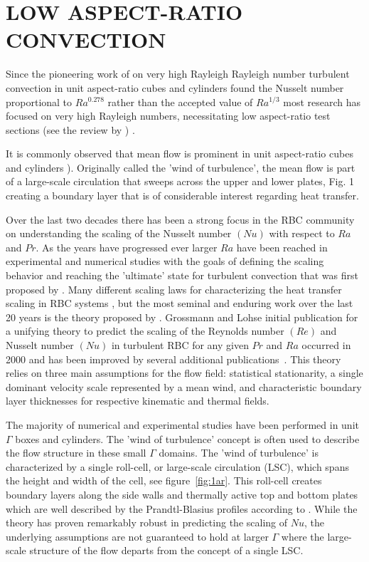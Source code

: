 \documentclass[twocolumn,10pt]{tsfp}
\begin{document}
\section*{LOW ASPECT-RATIO CONVECTION}

Since the pioneering work of \cite{castaing1989scaling} on very high Rayleigh Rayleigh number turbulent convection in unit aspect-ratio cubes and cylinders found the Nusselt number proportional to $Ra^{0.278}$ rather than the accepted value of $Ra^{1/3}$ most research has focused on very high Rayleigh numbers, necessitating low aspect-ratio test sections (see the review by \cite{ahlers2009heat}) . 

It is commonly observed that mean flow is prominent in unit aspect-ratio cubes and cylinders \citep{zocchi1990coherent, bodenschatz2000recent,ahlers2009heat}). 
Originally called the 'wind of turbulence', the mean flow is part of a large-scale circulation that sweeps across the upper and lower plates, Fig. 1 creating a boundary layer that is of considerable interest regarding heat transfer.

Over the last two decades there has been a strong focus in the RBC community on understanding the scaling of the Nusselt number $(Nu)$ with respect to $Ra$ and $Pr$.  
As the years have progressed ever larger $Ra$ have been reached in experimental and numerical studies with the goals of defining the scaling behavior and reaching the 'ultimate' state for turbulent convection that was first proposed by \cite{kraichnan1962turbulent}.  
Many different scaling laws for characterizing the heat transfer scaling in RBC systems \citep{ahlers2009heat}, but the most seminal and enduring work over the last 20 years is the theory proposed by \cite{grossmann2000scaling}.   
Grossmann and Lohse initial publication for a unifying theory to predict the scaling of the Reynolds number $(Re)$ and Nusselt number $(Nu)$ in turbulent RBC for any given $Pr$ and $Ra$ occurred in 2000 and has been improved by several additional publications~\citep{grossmann2001thermal,grossmann2002prandtl,grossmann2003geometry,grossmann2004fluctuations,stevens2013unifying}.  
This theory relies on three main assumptions for the flow field: statistical stationarity, a single dominant velocity scale represented by a mean wind, and characteristic boundary layer thicknesses for respective kinematic and thermal fields. 
  
The majority of numerical and experimental studies have been performed in unit $\Gamma$ boxes and cylinders.  The 'wind of turbulence' concept is often used to describe the flow structure in these small $\Gamma$ domains.  
The 'wind of turbulence' is characterized by a single roll-cell, or large-scale circulation (LSC), which spans the height and width of the cell, see figure~\ref{fig:1ar}.  This roll-cell creates boundary layers along the side walls and thermally active top and bottom plates which are well described by the Prandtl-Blasius profiles according to \cite{grossmann2000scaling}.  
While the theory has proven remarkably robust in predicting the scaling of $Nu$, the underlying assumptions are not guaranteed to hold at larger $\Gamma$ where the large-scale structure of the flow departs from the concept of a single LSC.
\end{document}
